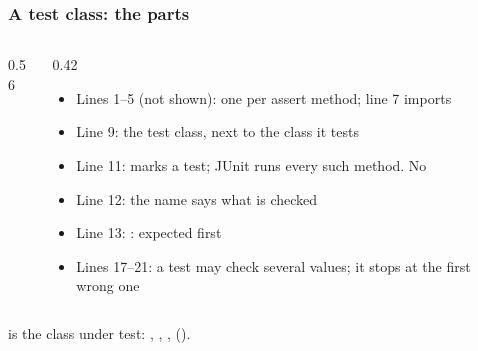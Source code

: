 \documentclass[aspectratio=169,10pt,compress]{beamer}
\begin{document}
\begin{frame}[t,fragile] \frametitle{A test class: the parts}
	\begin{columns}[T]
		\begin{column}{0.56\textwidth}
		\end{column}
		\begin{column}{0.42\textwidth}
			\begin{itemize}\footnotesize
				\item Lines 1--5 (not shown): one  per assert method; line 7 imports 
				\item Line 9: the test class, next to the class  it tests
				\item Line 11:  marks a test; JUnit runs every such method. No 
				\item Line 12: the name says what is checked
				\item Line 13: : expected first
				\item Lines 17--21: a test may check several values; it stops at the first wrong one
			\end{itemize}
		\end{column}
	\end{columns}

	\vspace{0.3em}
	\footnotesize {} is the class under test: , , , 
	().
\end{frame}
\end{document}
